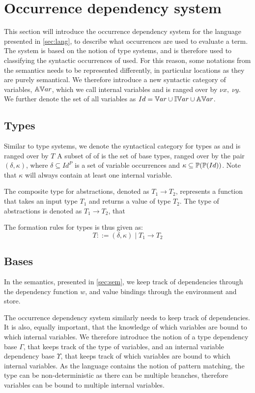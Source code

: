 \documentclass[../../master.tex]{subfiles}
\begin{document}
\section{Occurrence dependency system}
This section will introduce the occurrence dependency system for the language presented in \cref{sec:lang}, to describe what occurrences are used to evaluate a term.
The system is based on the notion of type systems, and is therefore used to classifying the syntactic occurrences of used.
For this reason, some notations from the semantics needs to be represented differently, in particular locations as they are purely semantical.
We therefore introduce a new syntactic category of variables, $\mathbb{AV}ar$, which we call internal variables and is ranged over by $\nu x,\;\nu y$.
We further denote the set of all variables as $Id=\mathbb{V}ar\cup\mathbb{IV}ar\cup\mathbb{AV}ar$.

\subsection{Types}
Similar to type systems, we denote the syntactical category for types as  and is ranged over by $T$
A subset of of  is the set of base types, ranged over by the pair $(\delta,\kappa)$, where $\delta\subseteq Id^P$ is a set of variable occurrences and $\kappa\subseteq\mathbb{P}(\mathbb{P}(Id))$.
Note that $\kappa$ will always contain at least one internal variable.

The composite type for abstractions, denoted as $T_1\rightarrow T_2$, represents a function that takes an input type $T_1$ and returns a value of type $T_2$.
The type of abstractions is denoted as $T_1\rightarrow T_2$, that 

The formation rules for types is thus given as:
$$T::=(\delta,\kappa)\mid T_1 \rightarrow T_2$$

\subsection{Bases}
In the semantics, presented in \cref{sec:sem}, we keep track of dependencies through the dependency function $w$, and value bindings through the environment and store.

The occurrence dependency system similarly needs to keep track of dependencies.
It is also, equally important, that the knowledge of which variables are bound to which internal variables.
We therefore introduce the notion of a type dependency base $\Gamma$, that keeps track of the type of variables, and an internal variable dependency base $\Upsilon$, that keeps track of which variables are bound to which internal variables. 
As the language contains the notion of pattern matching, the type can be non-deterministic as there can be multiple branches, therefore variables can be bound to multiple internal variables.
\end{document}
